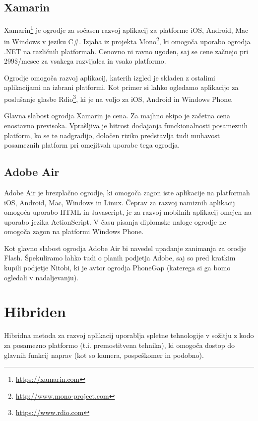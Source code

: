 \subsection{Xamarin}

Xamarin\footnote{\href{https://xamarin.com}{https://xamarin.com}} je ogrodje za sočasen razvoj aplikacij za platforme iOS, Android, Mac in Windows v jeziku C\#. Izjaha iz projekta Mono\footnote{\href{http://www.mono-project.com}{http://www.mono-project.com}}, ki omogoča uporabo ogrodja .NET na različnih platformah. Cenovno ni ravno ugoden, saj se cene začnejo pri 299\$/mesec za vsakega razvijalca in vsako platformo.

Ogrodje omogoča razvoj aplikacij, katerih izgled je skladen z ostalimi aplikacijami na izbrani platformi. Kot primer si lahko ogledamo aplikacijo za poslušanje glasbe Rdio\footnote{\href{https://www.rdio.com}{https://www.rdio.com}}, ki je na voljo za iOS, Android in Windows Phone.

Glavna slabost ogrodja Xamarin je cena. Za majhno ekipo je začetna cena enostavno previsoka. Vprašljiva je hitrost dodajanja funckionalnosti posameznih platform, ko se te nadgradijo, določen riziko predstavlja tudi muhavost posameznih platform pri omejitvah uporabe tega ogrodja.

\subsection{Adobe Air}

Adobe Air je brezplačno ogrodje, ki omogoča zagon iste aplikacije na platformah iOS, Android, Mac, Windows in Linux. Čeprav za razvoj namiznih aplikacij omogoča uporabo HTML in Javascript, je za razvoj mobilnih aplikacij omejen na uporabo jezika ActionScript. V času pisanja diplomske naloge ogrodje ne omogoča zagon na platformi Windows Phone.

Kot glavno slabost ogrodja Adobe Air bi navedel upadanje zanimanja za orodje Flash. Špekuliramo lahko tudi o planih podjetja Adobe, saj so pred kratkim kupili podjetje Nitobi, ki je avtor ogrodja PhoneGap (katerega si ga bomo ogledali v nadaljevanju).

\section{Hibriden}

Hibridna metoda za razvoj aplikacij uporablja spletne tehnologije v sožitju z kodo za posamezno platformo (t.i. premostitvena tehnika), ki omogoča dostop do glavnih funkcij naprav (kot so kamera, pospeškomer in podobno).

